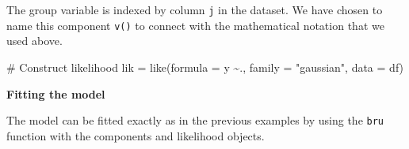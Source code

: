 \documentclass[
  letterpaper,
  DIV=11,
  numbers=noendperiod]{scrartcl}
\newenvironment{Shaded}{\begin{snugshade}}{\end{snugshade}}
\newcommand{\AttributeTok}[1]{\textcolor[rgb]{0.40,0.45,0.13}{#1}}
\newcommand{\CommentTok}[1]{\textcolor[rgb]{0.37,0.37,0.37}{#1}}
\newcommand{\FunctionTok}[1]{\textcolor[rgb]{0.28,0.35,0.67}{#1}}
\newcommand{\NormalTok}[1]{\textcolor[rgb]{0.00,0.23,0.31}{#1}}
\newcommand{\OtherTok}[1]{\textcolor[rgb]{0.00,0.23,0.31}{#1}}
\newcommand{\SpecialCharTok}[1]{\textcolor[rgb]{0.37,0.37,0.37}{#1}}
\newcommand{\StringTok}[1]{\textcolor[rgb]{0.13,0.47,0.30}{#1}}
\begin{document}
The group variable is indexed by column \texttt{j} in the dataset. We
have chosen to name this component \texttt{v()} to connect with the
mathematical notation that we used above.

\begin{Shaded}
\begin{Highlighting}[]
\CommentTok{\# Construct likelihood}
\NormalTok{lik }\OtherTok{=}  \FunctionTok{like}\NormalTok{(}\AttributeTok{formula =}\NormalTok{ y }\SpecialCharTok{\textasciitilde{}}\NormalTok{.,}
            \AttributeTok{family =} \StringTok{"gaussian"}\NormalTok{,}
            \AttributeTok{data =}\NormalTok{ df)}
\end{Highlighting}
\end{Shaded}

\textbf{Fitting the model}

The model can be fitted exactly as in the previous examples by using the
\texttt{bru} function with the components and likelihood objects.
\end{document}
